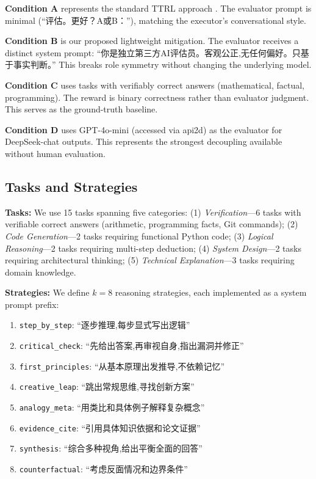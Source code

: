 \documentclass[11pt,a4paper]{article}
\begin{document}
\textbf{Condition A} represents the standard TTRL approach \cite{shinn2023reflexion, madaan2023selfrefine}. The evaluator prompt is minimal (``评估。更好？A或B：''), matching the executor's conversational style.

\textbf{Condition B} is our proposed lightweight mitigation. The evaluator receives a distinct system prompt: ``你是独立第三方AI评估员。客观公正,无任何偏好。只基于事实判断。'' This breaks role symmetry without changing the underlying model.

\textbf{Condition C} uses tasks with verifiably correct answers (mathematical, factual, programming). The reward is binary correctness rather than evaluator judgment. This serves as the ground-truth baseline.

\textbf{Condition D} uses GPT-4o-mini (accessed via api2d) as the evaluator for DeepSeek-chat outputs. This represents the strongest decoupling available without human evaluation.

\subsection{Tasks and Strategies}

\textbf{Tasks:} We use 15 tasks spanning five categories: (1) \textit{Verification}---6 tasks with verifiable correct answers (arithmetic, programming facts, Git commands); (2) \textit{Code Generation}---2 tasks requiring functional Python code; (3) \textit{Logical Reasoning}---2 tasks requiring multi-step deduction; (4) \textit{System Design}---2 tasks requiring architectural thinking; (5) \textit{Technical Explanation}---3 tasks requiring domain knowledge.

\textbf{Strategies:} We define $k=8$ reasoning strategies, each implemented as a system prompt prefix:

\begin{enumerate}[leftmargin=*,nosep]
    \item \texttt{step\_by\_step}: ``逐步推理,每步显式写出逻辑''
    \item \texttt{critical\_check}: ``先给出答案,再审视自身,指出漏洞并修正''
    \item \texttt{first\_principles}: ``从基本原理出发推导,不依赖记忆''
    \item \texttt{creative\_leap}: ``跳出常规思维,寻找创新方案''
    \item \texttt{analogy\_meta}: ``用类比和具体例子解释复杂概念''
    \item \texttt{evidence\_cite}: ``引用具体知识依据和论文证据''
    \item \texttt{synthesis}: ``综合多种视角,给出平衡全面的回答''
    \item \texttt{counterfactual}: ``考虑反面情况和边界条件''
\end{enumerate}
\end{document}
